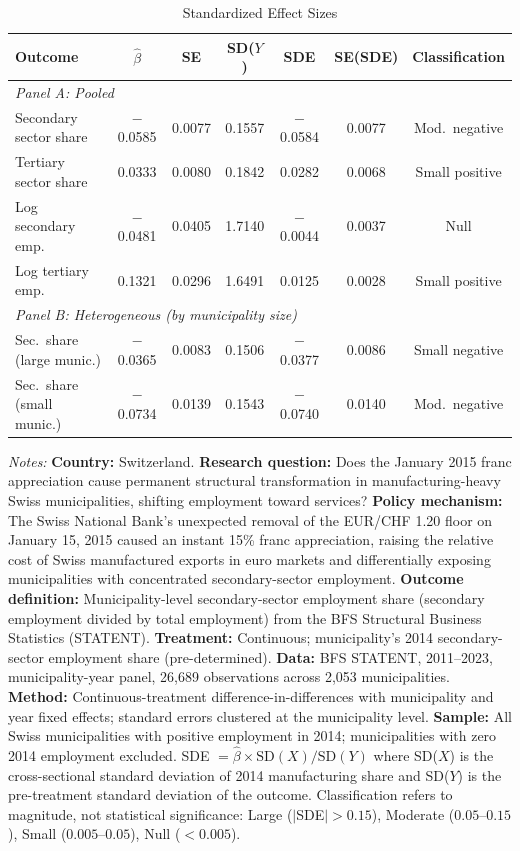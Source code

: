 \begin{table}[htbp]
\centering
\caption{Standardized Effect Sizes}
\label{tab:sde}
\small
\begin{tabular}{lcccccc}
\hline\hline
Outcome & $\hat{\beta}$ & SE & SD($Y$) & SDE & SE(SDE) & Classification \\
\hline
\multicolumn{7}{l}{\textit{Panel A: Pooled}} \\[3pt]
Secondary sector share & $-$0.0585 & 0.0077 & 0.1557 & $-$0.0584 & 0.0077 & Mod.\ negative \\
Tertiary sector share & 0.0333 & 0.0080 & 0.1842 & 0.0282 & 0.0068 & Small positive \\
Log secondary emp.\ & $-$0.0481 & 0.0405 & 1.7140 & $-$0.0044 & 0.0037 & Null \\
Log tertiary emp.\ & 0.1321 & 0.0296 & 1.6491 & 0.0125 & 0.0028 & Small positive \\[6pt]
\multicolumn{7}{l}{\textit{Panel B: Heterogeneous (by municipality size)}} \\[3pt]
Sec.\ share (large munic.) & $-$0.0365 & 0.0083 & 0.1506 & $-$0.0377 & 0.0086 & Small negative \\
Sec.\ share (small munic.) & $-$0.0734 & 0.0139 & 0.1543 & $-$0.0740 & 0.0140 & Mod.\ negative \\
\hline\hline
\end{tabular}

\par \raggedright \footnotesize
\textit{Notes:} \textbf{Country:} Switzerland. \textbf{Research question:} Does the January 2015 franc appreciation cause permanent structural transformation in manufacturing-heavy Swiss municipalities, shifting employment toward services? \textbf{Policy mechanism:} The Swiss National Bank's unexpected removal of the EUR/CHF 1.20 floor on January 15, 2015 caused an instant 15\% franc appreciation, raising the relative cost of Swiss manufactured exports in euro markets and differentially exposing municipalities with concentrated secondary-sector employment. \textbf{Outcome definition:} Municipality-level secondary-sector employment share (secondary employment divided by total employment) from the BFS Structural Business Statistics (STATENT). \textbf{Treatment:} Continuous; municipality's 2014 secondary-sector employment share (pre-determined). \textbf{Data:} BFS STATENT, 2011--2023, municipality-year panel, 26,689 observations across 2,053 municipalities. \textbf{Method:} Continuous-treatment difference-in-differences with municipality and year fixed effects; standard errors clustered at the municipality level. \textbf{Sample:} All Swiss municipalities with positive employment in 2014; municipalities with zero 2014 employment excluded. SDE $= \hat{\beta} \times \text{SD}(X) / \text{SD}(Y)$ where SD($X$) is the cross-sectional standard deviation of 2014 manufacturing share and SD($Y$) is the pre-treatment standard deviation of the outcome. Classification refers to magnitude, not statistical significance: Large ($|$SDE$| > 0.15$), Moderate ($0.05$--$0.15$), Small ($0.005$--$0.05$), Null ($< 0.005$).
\end{table}
